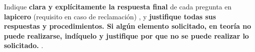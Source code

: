 \documentclass[12pt]{article}
\begin{document}
Indique \textbf{clara y explícitamente la respuesta final} de cada pregunta %
en \textbf{lapicero} (requisito en caso de reclamación) %
, y \textbf{justifique todas sus respuestas y procedimientos. Si algún elemento solicitado, en teoría no puede realizarse, indíquelo y justifique por que no se puede realizar lo solicitado. %
}.




\end{document}
